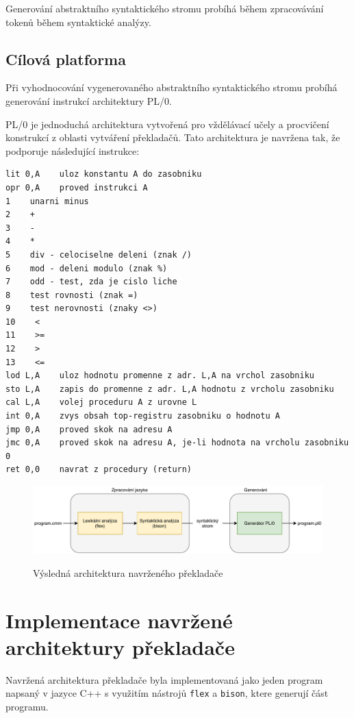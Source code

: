 \documentclass[12pt, a4paper]{article}
\let\oldsection\section
\renewcommand\section{\clearpage\oldsection}
\begin{document}
Generování abstraktního syntaktického stromu probíhá během zpracovávání tokenů během syntaktické analýzy. 

\subsection{Cílová platforma}
Při vyhodnocování vygenerovaného abstraktního syntaktického stromu probíhá generování instrukcí architektury PL/0.

PL/0 je jednoduchá architektura vytvořená pro vždělávací učely a procvičení konstrukcí z oblasti vytváření překladačů. Tato architektura je navržena tak, že podporuje následující instrukce:

\begin{lstlisting}[caption={Ukázka regulárních výrazů pro skenování tokenů}, captionpos=b, style=flex]
lit 0,A    uloz konstantu A do zasobniku
opr 0,A    proved instrukci A
1    unarni minus
2    +
3    -
4    *
5    div - celociselne deleni (znak /)
6    mod - deleni modulo (znak %)
7    odd - test, zda je cislo liche
8    test rovnosti (znak =)
9    test nerovnosti (znaky <>)
10    <
11    >=
12    >
13    <=
lod L,A    uloz hodnotu promenne z adr. L,A na vrchol zasobniku
sto L,A    zapis do promenne z adr. L,A hodnotu z vrcholu zasobniku
cal L,A    volej proceduru A z urovne L
int 0,A    zvys obsah top-registru zasobniku o hodnotu A
jmp 0,A    proved skok na adresu A
jmc 0,A    proved skok na adresu A, je-li hodnota na vrcholu zasobniku 0
ret 0,0    navrat z procedury (return)
\end{lstlisting}  


\begin{figure}[!ht]
    \centering
    {\includegraphics[width=\textwidth]{pdf/architecture.pdf}}
    \caption{Výsledná architektura navrženého překladače}
    \label{fig:screen-transition-diagram}
\end{figure}


\section{Implementace navržené architektury překladače}

Navržená architektura překladače byla implementovaná jako jeden program napsaný v jazyce C++ s využitím nástrojů \texttt{flex} a \texttt{bison}, ktere generují část programu.
\end{document}
